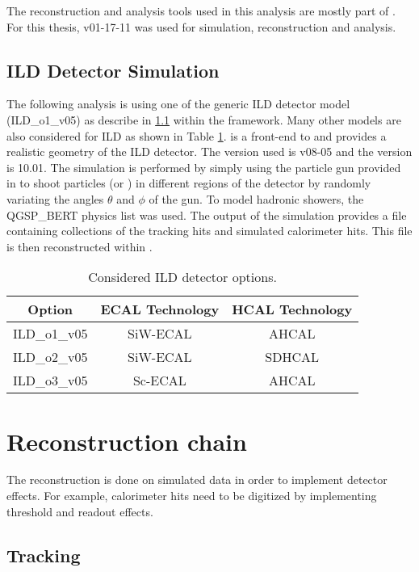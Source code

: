 The reconstruction and analysis tools used in this analysis are mostly part of \ilcsoft. For this thesis, \ilcsoft v01-17-11 was used for simulation, reconstruction and analysis.

\subsection{ILD Detector Simulation}

The following analysis is using one of the generic ILD detector model (ILD\_o1\_v05) as describe in \ref{} within the \mokka framework. Many other models are also considered for ILD as shown in Table \ref{table:ILDOptions}. \mokka is a front-end to \geant and provides a realistic geometry of the ILD detector. The \mokka version used is v08-05 and the \geant version is 10.01.
The simulation is performed by simply using the particle gun provided in \geant to shoot particles (\piminus or \kzeroL) in different regions of the detector by randomly variating the angles $\theta$ and $\phi$ of the gun. To model hadronic showers, the QGSP\_BERT physics list was used. The output of the simulation provides a \lcio file containing collections of the tracking hits and simulated calorimeter hits. This file is then reconstructed within \marlin.

\begin{table}[htb!]
  \centering
  \caption{Considered ILD detector options.} \label{table:ILDOptions}
  \begin{tabular}{|c|c|c|}
    \hline
    Option & ECAL Technology & HCAL Technology \\
    \hline
    ILD\_o1\_v05 & SiW-ECAL & AHCAL \\
    ILD\_o2\_v05 & SiW-ECAL & SDHCAL \\
    ILD\_o3\_v05 & Sc-ECAL & AHCAL \\
    \hline
  \end{tabular}
\end{table}

\section{Reconstruction chain}

The reconstruction is done on simulated data in order to implement detector effects. For example, calorimeter hits need to be digitized by implementing threshold and readout effects.

\subsection{Tracking}

